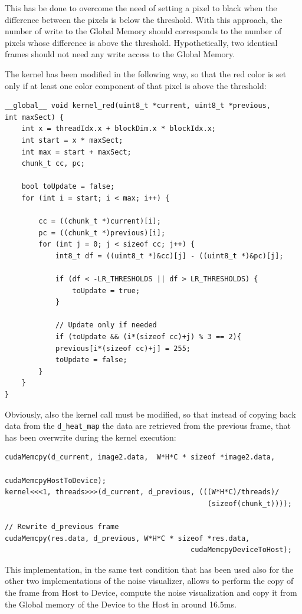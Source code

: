 \documentclass[paper=a4, fontsize=10pt]{scrartcl}	%
\begin{document}
	This has be done to overcome the need of setting a pixel to black when the difference between the pixels is below the threshold. With this approach, the number of write to the Global Memory should corresponds to the number of pixels whose difference is above the threshold. Hypothetically, two identical frames should not need any write access to the Global Memory.
	
	The kernel has been modified in the following way, so that the red color is set only if at least one color component of that pixel is above the threshold:
\begin{lstlisting}[style=CStyle]
__global__ void kernel_red(uint8_t *current, uint8_t *previous,
int maxSect) {
	int x = threadIdx.x + blockDim.x * blockIdx.x;
	int start = x * maxSect;
	int max = start + maxSect;
	chunk_t cc, pc;
	
	bool toUpdate = false;
	for (int i = start; i < max; i++) {
		
		cc = ((chunk_t *)current)[i];
		pc = ((chunk_t *)previous)[i];
		for (int j = 0; j < sizeof cc; j++) {
			int8_t df = ((uint8_t *)&cc)[j] - ((uint8_t *)&pc)[j];
			
			if (df < -LR_THRESHOLDS || df > LR_THRESHOLDS) {
				toUpdate = true;
			}
			
			// Update only if needed
			if (toUpdate && (i*(sizeof cc)+j) % 3 == 2){
			previous[i*(sizeof cc)+j] = 255;
			toUpdate = false;
		}
	}
}	\end{lstlisting}

	Obviously, also the kernel call must be modified, so that instead of copying back data from the \texttt{d\_heat\_map} the data are retrieved from the previous frame, that has been overwrite during the kernel execution:
	
\begin{lstlisting}[style=CStyle]
cudaMemcpy(d_current, image2.data,  W*H*C * sizeof *image2.data,
												cudaMemcpyHostToDevice);
kernel<<<1, threads>>>(d_current, d_previous, (((W*H*C)/threads)/
												(sizeof(chunk_t))));

// Rewrite d_previous frame
cudaMemcpy(res.data, d_previous, W*H*C * sizeof *res.data,
											cudaMemcpyDeviceToHost);\end{lstlisting}	
										
										
	This implementation, in the same test condition that has been used also for the other two implementations of the noise visualizer, allows to perform the copy of the frame from Host to Device, compute the noise visualization and copy it from the Global memory of the Device to the Host in around 16.5ms.
	
\end{document}
